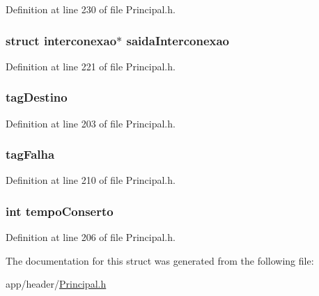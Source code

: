 Definition at line 230 of file Principal.\-h.

\hypertarget{structinterconexao_ab5e0438b9abf57d318825660da5cb279}{
\subsubsection[{saida\-Interconexao}]{\setlength{\rightskip}{0pt plus 5cm}struct {\bf interconexao}$\ast$ saida\-Interconexao}}\label{structinterconexao_ab5e0438b9abf57d318825660da5cb279}


Definition at line 221 of file Principal.\-h.

\hypertarget{structinterconexao_a14094f7ac62c8b911b9218533444f891}{
\subsubsection[{tag\-Destino}]{ tag\-Destino}}\label{structinterconexao_a14094f7ac62c8b911b9218533444f891}


Definition at line 203 of file Principal.\-h.

\hypertarget{structinterconexao_ab6bff15141ec55edeb4370cdee3fe3d8}{
\subsubsection[{tag\-Falha}]{ tag\-Falha}}\label{structinterconexao_ab6bff15141ec55edeb4370cdee3fe3d8}


Definition at line 210 of file Principal.\-h.

\hypertarget{structinterconexao_aadac5447051c1979a90f047e50e1119f}{
\subsubsection[{tempo\-Conserto}]{\setlength{\rightskip}{0pt plus 5cm}int tempo\-Conserto}}\label{structinterconexao_aadac5447051c1979a90f047e50e1119f}


Definition at line 206 of file Principal.\-h.



The documentation for this struct was generated from the following file\-:\begin{DoxyCompactItemize}
\item 
app/header/\hyperlink{_principal_8h}{Principal.\-h}\end{DoxyCompactItemize}
